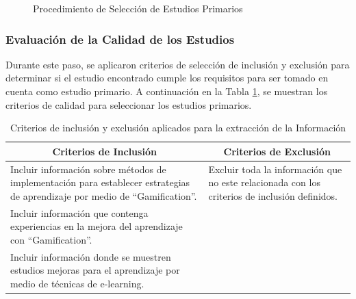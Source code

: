 \documentclass{report}
\begin{document}
            \begin{figure}
                \centering
        		\caption{Procedimiento de Selección de Estudios Primarios}
         	\end{figure}
            
            \subsubsection{Evaluación de la Calidad de los Estudios}
            Durante este paso, se aplicaron criterios de selección de inclusión y exclusión para determinar si el estudio encontrado cumple los requisitos para ser tomado en cuenta como estudio primario. A continuación en la Tabla \ref{table:CriteriosInclusionExclusionCalidad}, se muestran los criterios de calidad para seleccionar los estudios primarios.
            
            \begin{table}[H]
                \begin{center}
                    \caption{Criterios de inclusión y exclusión aplicados para la extracción de la Información}
                    \label{table:CriteriosInclusionExclusionCalidad}
                    \begin{tabular}{| p{7cm} | p{7cm} |}
                        \toprule
                        \hline
                        \multicolumn{1}{|c|}{\textbf{Criterios de Inclusión}} & \multicolumn{1}{|c|}{\textbf{Criterios de Exclusión}} \\
                        \hline
                        Incluir información sobre métodos de implementación para establecer estrategias de aprendizaje por medio de ``Gamification''.{ }& Excluir toda la información que no este relacionada con los criterios de inclusión definidos.\\
                        \hline
                        Incluir información que contenga experiencias en la mejora del aprendizaje con ``Gamification''. &{ } \\
                        \hline
                        Incluir información donde se muestren estudios mejoras para el aprendizaje por medio de técnicas de e-learning.\\ \hline
                    \end{tabular}
                \end{center}
            \end{table}
            
\end{document}
